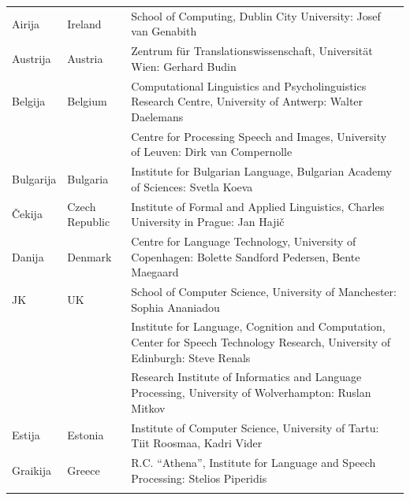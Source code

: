 \small
\begin{longtable}{llp{113mm}}
  Airija & \textcolor{grey1}{Ireland} & School of Computing, Dublin City University: Josef van Genabith\\ \addlinespace
  
  Austrija & \textcolor{grey1}{Austria} & Zentrum für Translationswissenschaft, Universität Wien: Gerhard Budin\\ \addlinespace
  
  Belgija & \textcolor{grey1}{Belgium} & Computational Linguistics and Psycholinguistics Research Centre, University of Antwerp: Walter Daelemans\\ \addlinespace
  & & Centre for Processing Speech and Images, University of Leuven: Dirk van Compernolle \\ \addlinespace
  
  Bulgarija & \textcolor{grey1}{Bulgaria} & Institute for Bulgarian Language, Bulgarian Academy of Sciences: Svetla Koeva \\ \addlinespace
  
  Čekija & \textcolor{grey1}{Czech Republic} & Institute of Formal and Applied Linguistics, Charles University in Prague: Jan Hajič \\ \addlinespace
  
  Danija &  \textcolor{grey1}{Denmark} & Centre for Language Technology, University of Copenhagen: \newline Bolette Sandford Pedersen, Bente Maegaard\\ \addlinespace
  
  JK & \textcolor{grey1}{UK} & School of Computer Science, University of Manchester: Sophia Ananiadou \\ \addlinespace 
  & & Institute for Language, Cognition and Computation, Center for Speech Technology Research, University of Edinburgh: Steve Renals \\ \addlinespace 
  & & Research Institute of Informatics and Language Processing, University of Wolverhampton: Ruslan Mitkov \\ \addlinespace
  
  Estija & \textcolor{grey1}{Estonia} & Institute of Computer Science, University of Tartu: Tiit Roosmaa, Kadri Vider\\ \addlinespace
  
  Graikija & \textcolor{grey1}{Greece} & R.C. “Athena”, Institute for Language and Speech Processing: Stelios Piperidis\\ \addlinespace
  

\end{longtable}
